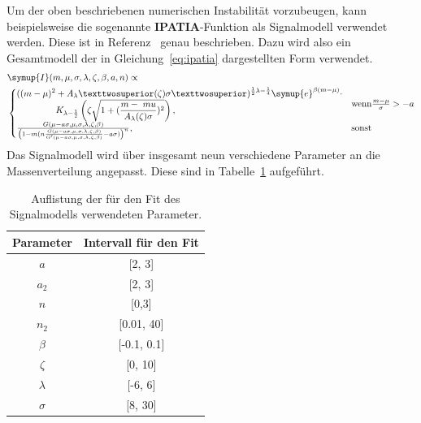 %
Um der oben beschriebenen numerischen Instabilität vorzubeugen, kann beispielsweise die sogenannte \textbf{IPATIA}-Funktion als Signalmodell verwendet werden. Diese ist in Referenz~\cite{ipatia} genau beschrieben. Dazu wird also ein Gesamtmodell der in Gleichung~\ref{eq:ipatia} dargestellten Form verwendet.
%
\begin{equation}
  \begin{split}
  &\symup{I}(m,\mu,\sigma,\lambda,\zeta,\beta,a,n)\propto\\
    &\begin{cases}
      \begin{split}
      ((m-\mu)^2&+A_\lambda²(\zeta)\sigma²)^{\frac{1}{2}\lambda-\frac{1}{4}}\symup{e}^{\beta(m-\mu)}\cdot\\
      &K_{\lambda-\frac{1}{2}}\left(\zeta\sqrt{1+(\frac{m-\ mu}{A_\lambda(\zeta)\sigma})^2}\right),
      \end{split} & \text{wenn} \frac{m-\mu}{\sigma}>-a \\
      \frac{G(\mu-a\sigma,\mu,\sigma,\lambda,\zeta,\beta)}{\left(1-m\/(n\frac{G(\mu-a\sigma,\mu,\sigma,\lambda,\zeta,\beta)}{G'(\mu-a\sigma,\mu,\sigma,\lambda,\zeta,\beta)}-a\sigma)\right)^n} ,& \text{sonst}
    \end{cases}
  \end{split}
  \label{eq:ipatia}
\end{equation}
%
Das Signalmodell wird über insgesamt neun verschiedene Parameter an die Massenverteilung angepasst. Diese sind in Tabelle~\ref{tab:params} aufgeführt.
%
\begin{table}[H]
  \centering
  \caption{Auflistung der für den Fit des Signalmodells verwendeten Parameter.}
  \begin{tabular}{cc}
    \toprule
    Parameter    & Intervall für den Fit \\
    \midrule
    $a$          & [2, 3] \\
    $a_2$        & [2, 3] \\
    $n$          & [0,3] \\
    $n_2$        & [0.01, 40] \\
    $\beta$      & [-0.1, 0.1] \\
    $\zeta$      & [0, 10] \\
    $\lambda$    & [-6, 6] \\
    $\sigma$     & [8, 30] \\
    \bottomrule
  \end{tabular}
  \label{tab:params}
\end{table}
